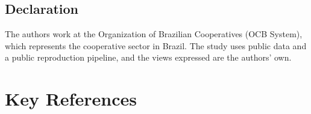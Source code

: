 \documentclass[11pt,a4paper]{article}
\begin{document}
\subsection*{Declaration}

The authors work at the Organization of Brazilian Cooperatives (OCB System), which
represents the cooperative sector in Brazil. The study uses public data and a public
reproduction pipeline, and the views expressed are the authors' own.

\section{Key References}

\renewcommand{\refname}{}
\vspace{-2.5em}


\end{document}
